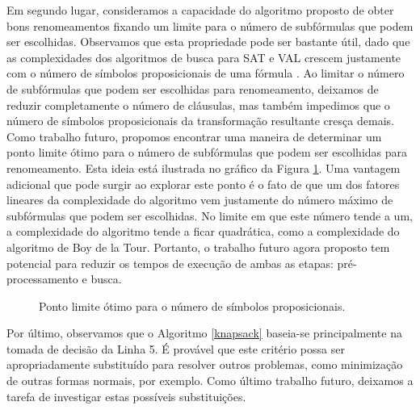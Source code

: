 Em segundo lugar, consideramos a capacidade do algoritmo proposto de obter bons renomeamentos fixando um limite para o número de subfórmulas que podem ser escolhidas. Observamos que esta propriedade pode ser bastante útil, dado que as complexidades dos algoritmos de busca para SAT e VAL crescem justamente com o número de símbolos proposicionais de uma fórmula \cite{davis1960computing,davis1962machine,biere2009conflict}. Ao limitar o número de subfórmulas que podem ser escolhidas para renomeamento, deixamos de reduzir completamente o número de cláusulas, mas também impedimos que o número de símbolos proposicionais da transformação resultante cresça demais. Como trabalho futuro, propomos encontrar uma maneira de determinar um ponto limite ótimo para o número de subfórmulas que podem ser escolhidas para renomeamento. Esta ideia está ilustrada no gráfico da Figura \ref{limitando}. Uma vantagem adicional que pode surgir ao explorar este ponto é o fato de que um dos fatores lineares da complexidade do algoritmo vem justamente do número máximo de subfórmulas que podem ser escolhidas. No limite em que este número tende a um, a complexidade do algoritmo tende a ficar quadrática, como a complexidade do algoritmo de Boy de la Tour. Portanto, o trabalho futuro agora proposto tem potencial para reduzir os tempos de execução de ambas as etapas: pré-processamento e busca.

\begin{figure}
	\begin{center}
\end{center}
\label{limitando}
\caption{Ponto limite ótimo para o número de símbolos proposicionais.}
\end{figure}

Por último, observamos que o Algoritmo \ref{knapsack} baseia-se principalmente na tomada de decisão da Linha 5. É provável que este critério possa ser apropriadamente substituído para resolver outros problemas, como minimização de outras formas normais, por exemplo. Como último trabalho futuro, deixamos a tarefa de investigar estas possíveis substituições.
